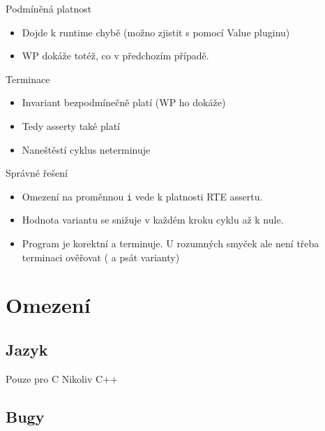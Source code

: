 \documentclass[11pt]{beamer}
\begin{document}
\begin{frame}{Podmíněná platnost}
	\lstExIIwpItryIII
	\begin{itemize}
		\item Dojde k runtime chybě (možno zjistit s pomocí Value pluginu)
		\item WP dokáže totéž, co v předchozím případě.
	\end{itemize}
\end{frame}


\begin{frame}{Terminace}
	\lstExIIwpItryIV
	\begin{itemize}
		\item Invariant bezpodmínečně platí (WP ho dokáže)
		\item Tedy asserty také platí
		\pause \item Naneštěstí cyklus neterminuje
	\end{itemize}
\end{frame}


\begin{frame}{Správné řešení}
	\lstExIIwpItryV
	\begin{itemize}
		\item Omezení na proměnnou \texttt{i} vede k platnosti RTE assertu.
		\item Hodnota variantu se snižuje v každém kroku cyklu až k nule.
		\item Program je korektní a terminuje. U rozumných smyček ale není třeba terminaci ověřovat ( a psát varianty)
	\end{itemize}
\end{frame}

\section{Omezení}
\subsection{Jazyk}
\begin{frame}{Pouze pro C}
Nikoliv C++
\end{frame}
\subsection{Bugy}
\end{document}

